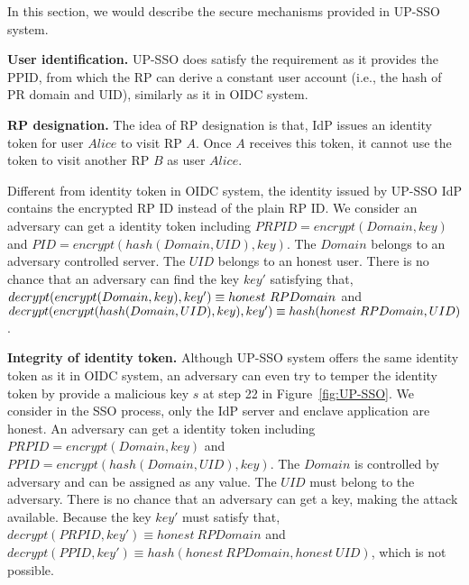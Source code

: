 In this section, we would describe the secure mechanisms provided in UP-SSO system. 

\vspace{3mm}\noindent\textbf{User identification.}
UP-SSO does satisfy the requirement as it provides the PPID, from which the RP can derive a constant user account (i.e., the hash of PR domain and UID), similarly as it in OIDC system. 


\vspace{3mm}\noindent\textbf{RP designation.} 
The idea of RP designation is that, IdP issues an identity token for user $Alice$ to visit RP $A$. Once $A$ receives this token, it cannot use the token to visit another RP $B$ as user $Alice$.
 
Different from identity token in OIDC system, the identity issued by UP-SSO IdP contains the encrypted RP ID instead of the plain RP ID. 
We consider an adversary can get a identity token including $PRPID=encrypt(Domain, key)$ and $PID=encrypt(hash(Domain, UID), key)$. The $Domain$ belongs to an adversary controlled server. The $UID$ belongs to an honest user. 
There is no chance that an adversary can find the key $key'$ satisfying that, $decrypt(encrypt\\(Domain, key), key') \equiv honest\ RPDomain$ and  $ decrypt(encrypt(hash(Domain, \\UID), key), key')  \equiv  hash(honest\ RPDomain, UID)$.



\vspace{3mm}\noindent\textbf{Integrity of identity token.}
Although UP-SSO system offers the same identity token as it in OIDC system, an adversary can even try to temper the identity token by provide a malicious key $s$ at step 22 in Figure~\ref{fig:UP-SSO}. 
We consider in the SSO process, only the IdP server and enclave application are honest. An adversary can get a identity token including $PRPID=encrypt(Domain, key)$ and $PPID=encrypt(hash(Domain, UID), key)$. The $Domain$ is controlled by adversary and can be assigned as any value. The $UID$ must belong to the adversary. There is no chance that an adversary can get a key, making the attack available. Because the key $key'$ must satisfy that, $decrypt(PRPID, key') \equiv honest\ RPDomain$ and  $decrypt(PPID, key') \equiv  hash(honest\ RPDomain, honest\ UID)$, which is not possible.

